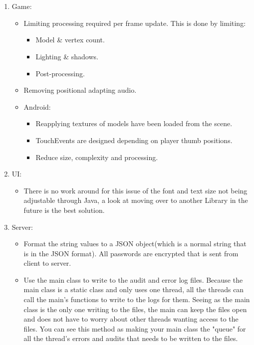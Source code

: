 \documentclass[letterpaper]{article}
\begin{document}
		\vspace{0.2in}
		\section*{\colorbox{black}{}}
		\vspace{0.1in}	
			
			\begin{enumerate}
				\item Game:
					\begin{itemize}
						\item Limiting processing required per frame update. This is done by limiting:
							\begin{itemize}
								\item Model \& vertex count.
								\item Lighting \& shadows.
								\item Post-processing.
							\end{itemize}
						\item Removing positional adapting audio.
						\item Android:
							\begin{itemize}
								\item Reapplying textures of models have been loaded from the scene.
								\item TouchEvents are designed depending on player thumb positions.
								\item Reduce size, complexity and processing.\\
							\end{itemize}
					\end{itemize}
				\item UI: 
					\begin{itemize}
						\item There is no work around for this issue of the font and text size not being adjustable through Java, a look at moving over to another Library in the future is the best solution.
					\end{itemize}
				\item Server:
					\begin{itemize}
						\item Format the string values to a JSON object(which is a normal string that is in the JSON format). All passwords are encrypted that is sent from client to server.
						\item Use the main class to write to the audit and error log files. Because the main class is a static class and only uses one thread, all the threads can call the main's functions to write to the logs for them. Seeing as the main class is the only one writing to the files, the main can keep the files open and does not have to worry about other threads wanting access to the files. You can see this method as making your main class the "queue" for all the thread's errors and audits that needs to be written to the files. 
					\end{itemize}
			\end{enumerate}
				
\end{document}
